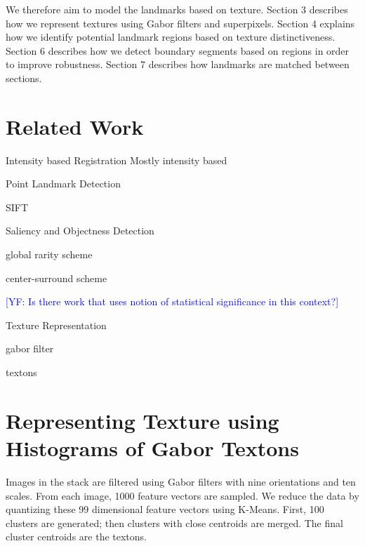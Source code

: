 \documentclass{llncs}
\newcommand{\authcmt}[2]{\textcolor{#1}{#2}}
\newcommand{\yoav}[1]{\authcmt{blue}{[YF: #1]}}
\begin{document}
We therefore aim to model the landmarks based on texture. Section 3 describes how we represent textures using Gabor filters and superpixels. Section 4 explains how we identify potential landmark regions based on texture distinctiveness. Section 6 describes how we detect boundary segments based on regions in order to improve robustness. Section 7 describes how landmarks are matched between sections.

%
%


\section{Related Work}

\begin{description}

\item{Intensity based Registration}
Mostly intensity based


\item{Point Landmark Detection}

SIFT

\item{Saliency and Objectness Detection}

global rarity scheme

center-surround scheme

\yoav{Is there work that uses notion of statistical significance in
  this context?}

\item{Texture Representation}

gabor filter

textons


\end{description}

\section{Representing Texture using Histograms of Gabor Textons} 

Images in the stack are filtered using Gabor filters with nine orientations and ten scales. From each image, 1000 feature vectors are sampled. We reduce the data by quantizing these 99 dimensional feature vectors using K-Means. First, 100 clusters are generated; then clusters with close centroids are merged. The final cluster centroids are the textons. 
\end{document}
